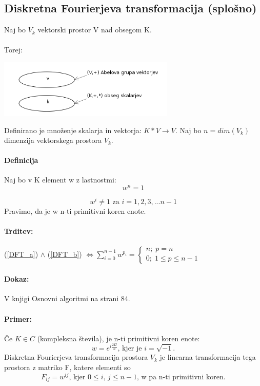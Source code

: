 \documentclass[a4paper,10pt]{article}
\begin{document}
\subsection{Diskretna Fourierjeva transformacija (splo\v sno)}

Naj bo $V_k$ vektorski prostor V nad obsegom K.\\
\\
Torej:\\
	\begin{center}
	\includegraphics[width=8.4cm,height=2.75cm]{Slike/DFTSplosno.png}
	\end{center}
Definirano je mno\v zenje skalarja in vektorja: $K\ast V \rightarrow V$. Naj bo $n = dim(V_k)$ dimenzija vektorskega prostora $V_k$.

\paragraph{Definicija}
Naj bo v K element w z lastnostmi:\\
\begin{equation}
w^n = 1
\label{DFT_a}
\end{equation}

\begin{equation}
w^i\neq 1 \mbox{ za } i=1,2,3,...n-1
\label{DFT_b}
\end{equation}
Pravimo, da je w n-ti primitivni koren enote.

\paragraph{Trditev:}
(\ref{DFT_a}) $\wedge$ (\ref{DFT_b}) $
\Longleftrightarrow
\sum_{i=0}^{n-1}w^{p_i} = 
\left\{ 
\begin{array}{l}
n;\; p=n \\
0;\; 1 \leq p \leq n-1
\end{array}
\right.
$

\paragraph{Dokaz:}
V knjigi Osnovni algoritmi na strani 84.

\paragraph{Primer:}
\v Ce $K \in C$ (kompleksna \v stevila), je n-ti primitivni koren enote:
$$
w = e^{i\frac{2\Pi}{n}} \mbox{, kjer je } i=\sqrt{-1}\mbox{.}
$$
Diskretna Fourierjeva transformacija prostora $V_k$ je linearna transformacija tega prostora z matriko F, katere elementi so 
$$
F_{ij} = w^{ij} \mbox{, kjer } 0 \leq i \mbox{, } j \leq n-1 \mbox{, w pa n-ti primitivni koren.}
$$
\end{document}
